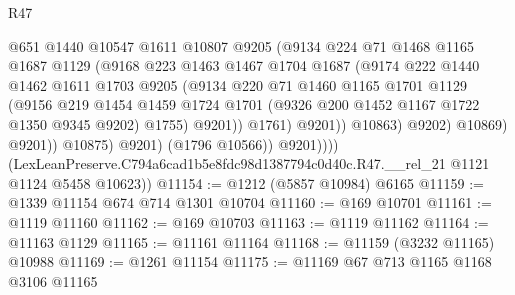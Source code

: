 \begin{lexlean}{R47}
\begin{coremodule}
                                @651
                                @1440
                                @10547
                                @1611
                                @10807
                                @9205
                                (@9134
                                  @224
                                  @71
                                  @1468
                                  @1165
                                  @1687
                                  @1129
                                  (@9168
                                    @223
                                    @1463
                                    @1467
                                    @1704
                                    @1687
                                    (@9174
                                      @222
                                      @1440
                                      @1462
                                      @1611
                                      @1703
                                      @9205
                                      (@9134
                                        @220
                                        @71
                                        @1460
                                        @1165
                                        @1701
                                        @1129
                                        (@9156
                                          @219
                                          @1454
                                          @1459
                                          @1724
                                          @1701
                                          (@9326 @200 @1452 @1167 @1722 @1350 @9345 @9202)
                                          @1755)
                                        @9201))
                                    @1761)
                                  @9201))
                              @10863)
                            @9202)
                          @10869)
                        @9201))
                    @10875)
                  @9201)
                (@1796 @10566))
              @9201))))
      (LexLeanPreserve.C794a6cad1b5e8fdc98d1387794c0d40c.R47.__rel_21 @1121 @1124 @5458 @10623))
@11154 := @1212 (@5857 @10984) @6165
@11159 := @1339 @11154 @674 @714 @1301 @10704
@11160 := @169 @10701
@11161 := @1119 @11160
@11162 := @169 @10703
@11163 := @1119 @11162
@11164 := @11163 @1129
@11165 := @11161 @11164
@11168 := @11159 (@3232 @11165) @10988
@11169 := @1261 @11154
@11175 := @11169 @67 @713 @1165 @1168 @3106 @11165

\end{coremodule}
\end{lexlean}
